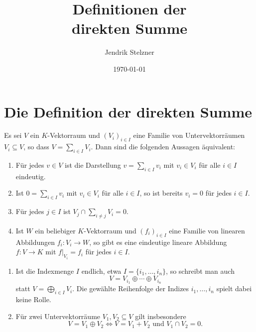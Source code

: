 \documentclass[a4paper,10pt]{scrartcl}
\title{Definitionen der \\ direkten Summe}
\author{Jendrik Stelzner}
\date{\today}
\begin{document}
\maketitle


\begin{abstract}
\end{abstract}


\tableofcontents





\section{Die Definition der direkten Summe}


\begin{proposition}\label{prop: characterization of the inner direct sum}
  Es sei $V$ ein $K$-Vektorraum und $(V_i)_{i \in I}$ eine Familie von Untervektorräumen $V_i \subseteq V$, so dass $V = \sum_{i \in I} V_i$.
  Dann sind die folgenden Aussagen äquivalent:
  \begin{enumerate}
    \item\label{enum: unique sum representation}
      Für jedes $v \in V$ ist die Darstellung $v = \sum_{i \in I} v_i$ mit $v_i \in V_i$ für alle $i \in I$ eindeutig.
    \item\label{enum: unique sum representation of zero}
      Ist $0 = \sum_{i \in I} v_i$ mit $v_i \in V_i$ für alle $i \in I$, so ist bereits $v_i = 0$ für jedes $i \in I$.
    \item\label{enum: intersections are zero}
      Für jedes $j \in I$ ist $V_j \cap \sum_{i \neq j} V_i = 0$.
    \item\label{enum: universal property}
      Ist $W$ ein beliebiger $K$-Vektorraum und $(f_i)_{i \in I}$ eine Familie von linearen Abbildungen \mbox{$f_i \colon V_i \to W$}, so gibt es eine eindeutige lineare Abbildung $f \colon V \to K$ mit $f|_{V_i} = f_i$ für jedes $i \in I$.
  \end{enumerate}
\end{proposition}


\begin{remark}
  \begin{enumerate}[leftmargin=*]
    \item
      Ist die Indexmenge $I$ endlich, etwa $I = \{i_1, \dotsc, i_n\}$, so schreibt man auch
      \[
        V = V_{i_1} \oplus \dotsb \oplus V_{i_n}
      \]
      statt $V = \bigoplus_{i \in I} V_i$.
      Die gewählte Reihenfolge der Indizes $i_1, \dotsc, i_n$ spielt dabei keine Rolle.
    \item
      Für zwei Untervektorräume $V_1, V_2 \subseteq V$ gilt insbesondere
      \[
        V = V_1 \oplus V_2
        \iff
        \text{$V = V_1 + V_2$ und $V_1 \cap V_2 = 0$}.
      \]
  \end{enumerate}
\end{remark}
\end{document}
